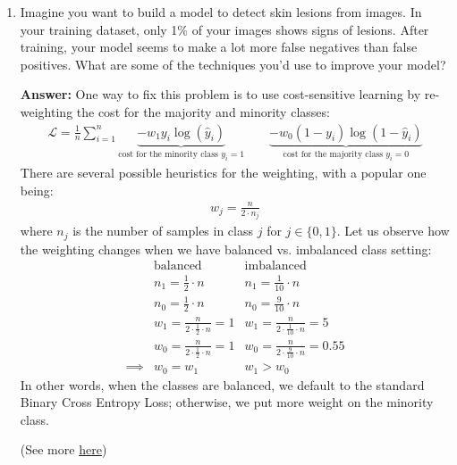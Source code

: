 \documentclass{article}
\newenvironment{QandA}{\begin{enumerate}[label=\arabic*.]}{\end{enumerate}}
\newenvironment{InnerQandA}{\begin{enumerate}[label=\roman*.]}{\end{enumerate}}
\newenvironment{answer}{\par\normalfont \textbf{Answer:}}{}
\begin{document}
\begin{QandA}
\begin{InnerQandA}
        \item Imagine you want to build a model to detect skin lesions from images. In your training dataset, only 1\% of your images shows signs of lesions. After training, your model seems to make a lot more false negatives than false positives. What are some of the techniques you'd use to improve your model?
        \begin{answer}
            One way to fix this problem is to use cost-sensitive learning by re-weighting the cost for the majority and minority classes:
            \begin{align*}
                \mathcal{L} = \frac{1}{n} \sum_{i=1}^n \underbrace{-w_1 y_i \log (\hat{y}_i)}_{\text{cost for the minority class } y_i = 1} \quad \quad \underbrace{-w_0(1 - y_i)\log(1 - \hat{y}_i)}_{\text{cost for the majority class } y_i = 0}
            \end{align*}
            There are several possible heuristics for the weighting, with a popular one being:
            \begin{align*}
                w_j = \frac{n}{2 \cdot n_j}
            \end{align*}
            where $n_j$ is the number of samples in class $j$ for $j \in \{0, 1\}$. Let us observe how the weighting changes when we have balanced vs. imbalanced class setting:
            \begin{align*}
                &\text{balanced} &\text{imbalanced} \\
                &n_1 = \frac{1}{2}\cdot n &n_1 = \frac{1}{10} \cdot n \\
                &n_0 = \frac{1}{2} \cdot n & n_0 = \frac{9}{10} \cdot n \\
                &w_1 = \frac{n}{2 \cdot \frac{1}{2} \cdot n} = 1 &w_1 = \frac{n}{2 \cdot \frac{1}{10} \cdot n} = 5 \\
                &w_0 = \frac{n}{2 \cdot \frac{1}{2}\cdot n} = 1 &w_0 = \frac{n}{2 \cdot \frac{9}{10} \cdot n} = 0.55 \\
                \implies &w_0 = w_1 &w_1 > w_0
            \end{align*}
            In other words, when the classes are balanced, we default to the standard Binary Cross Entropy Loss; otherwise, we put more weight on the minority class.

            (See more \href{https://www.youtube.com/watch?v=vJkWB_kmadQ&ab_channel=Dr.DataScience}{here})
        \end{answer}
    \end{InnerQandA}


\end{QandA}
\end{document}
